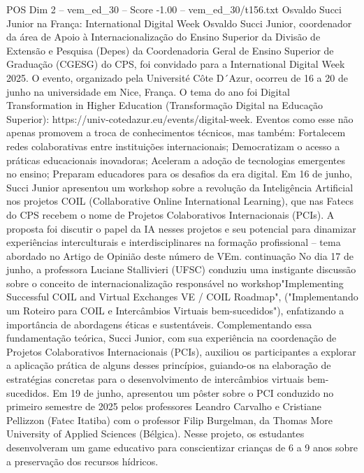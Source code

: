 \begin{textsample}{POS Dim 2 – vem\_ed\_30 – Score -1.00 – vem\_ed\_30/t156.txt}  \label{ex:f2_pos_051}
Osvaldo Succi Junior na França: International Digital Week Osvaldo Succi Junior, coordenador da área de Apoio à Internacionalização do Ensino Superior da Divisão de Extensão e Pesquisa (Depes) da Coordenadoria Geral de Ensino Superior de Graduação (CGESG) do CPS, foi convidado para a International Digital Week 2025.
O evento, organizado pela Université Côte D´Azur, ocorreu de 16 a 20 de junho na universidade em Nice, França.
O tema do ano foi Digital Transformation in Higher Education (Transformação Digital na Educação Superior): https://univ-cotedazur.eu/events/digital-week.
Eventos como esse não apenas promovem a troca de conhecimentos técnicos, mas também: Fortalecem redes colaborativas entre instituições internacionais; Democratizam o acesso a práticas educacionais inovadoras; Aceleram a adoção de tecnologias emergentes no ensino; Preparam educadores para os desafios da era digital.
Em 16 de junho, Succi Junior apresentou um workshop sobre a revolução da Inteligência Artificial nos projetos COIL (Collaborative Online International Learning), que nas Fatecs do CPS recebem o nome de Projetos Colaborativos Internacionais (PCIs).
A proposta foi discutir o papel da IA nesses projetos e seu potencial para dinamizar experiências interculturais e interdisciplinares na formação profissional – tema abordado no Artigo de Opinião deste número de VEm. continuação No dia 17 de junho, a professora Luciane Stallivieri (UFSC) conduziu uma instigante discussão sobre o conceito de internacionalização responsável no workshop"Implementing Successful COIL and Virtual Exchanges VE / COIL Roadmap", ("Implementando um Roteiro para COIL e Intercâmbios Virtuais bem-sucedidos"), enfatizando a importância de abordagens éticas e sustentáveis.
Complementando essa fundamentação teórica, Succi Junior, com sua experiência na coordenação de Projetos Colaborativos Internacionais (PCIs), auxiliou os participantes a explorar a aplicação prática de alguns desses princípios, guiando-os na elaboração de estratégias concretas para o desenvolvimento de intercâmbios virtuais bem-sucedidos.
Em 19 de junho, apresentou um pôster sobre o PCI conduzido no primeiro semestre de 2025 pelos professores Leandro Carvalho e Cristiane Pellizzon (Fatec Itatiba) com o professor Filip Burgelman, da Thomas More University of Applied Sciences (Bélgica).
Nesse projeto, os estudantes desenvolveram um game educativo para conscientizar crianças de 6 a 9 anos sobre a preservação dos recursos hídricos.

\end{textsample}

